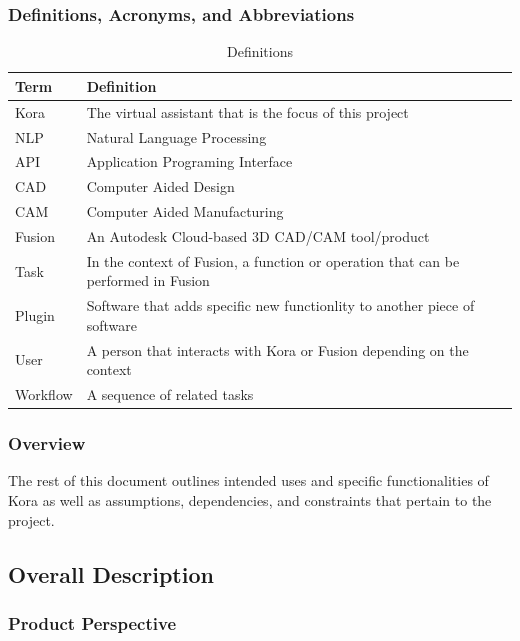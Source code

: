 \documentclass[onecolumn, draftclsnofoot,10pt, compsoc]{IEEEtran}
\def \botname{Kora\xspace}
\begin{document}
	\subsubsection{Definitions, Acronyms, and Abbreviations}
	\begin{table}[h]
		\centering
		\caption{Definitions}
		\label{my-label}
		\begin{tabular}{|l|l|}
			\hline
			\textbf{Term} & \textbf{Definition} \\ \hline
			\botname & The virtual assistant that is the focus of this project \\ \hline
			NLP & Natural Language Processing \\ \hline
			API & Application Programing Interface \\ \hline
			CAD & Computer Aided Design \\ \hline
			CAM & Computer Aided Manufacturing \\ \hline
			Fusion & An Autodesk Cloud-based 3D CAD/CAM tool/product \\ \hline
			Task & In the context of Fusion, a function or operation that can be performed in Fusion \\ \hline
			Plugin & Software that adds specific new functionlity to another piece of software \\ \hline
			User & A person that interacts with \botname or Fusion depending on the context \\ \hline
			Workflow & A sequence of related tasks \\ \hline
		\end{tabular}
	\end{table}
	\subsubsection{Overview}
	The rest of this document outlines intended uses and specific functionalities of \botname as well as assumptions, dependencies, and constraints that pertain to the project.

	\subsection{Overall Description}
	\subsubsection{Product Perspective}
\end{document}
